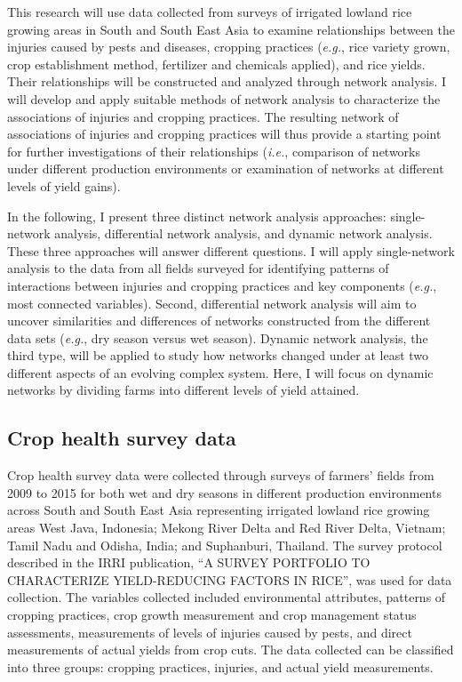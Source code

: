 
This research will use data collected from surveys of irrigated lowland rice growing areas in South and South East Asia to examine relationships between the injuries caused by pests and diseases, cropping practices (\textit{e.g.}, rice variety grown, crop establishment method, fertilizer and chemicals applied), and rice yields. Their relationships will be constructed and analyzed through network analysis. I will develop and apply suitable methods of network analysis to characterize the associations of injuries and cropping practices. The resulting network of associations of injuries and cropping practices will thus provide a starting point for further investigations of their relationships (\textit{i.e.}, comparison of networks under different production environments or examination of networks at different levels of yield gains). 

In the following, I present three distinct network analysis approaches: single-network analysis, differential network analysis, and dynamic network analysis. These three approaches will answer different questions. I will apply single-network analysis to the data from all fields surveyed for identifying patterns of interactions between injuries and cropping practices and key components (\textit{e.g.}, most connected variables). Second, differential network analysis will aim to uncover similarities and differences of networks constructed from the different data sets (\textit{e.g.}, dry season versus wet season). Dynamic network analysis, the third type, will be applied to study how networks changed under at least two different aspects of an evolving complex system. Here, I will focus on dynamic networks by dividing farms into different levels of yield attained. 

\subsection*{Crop health survey data}

Crop health survey data were collected through surveys of farmers' fields from 2009 to 2015 for both wet and dry seasons in different production environments across South and South East Asia representing irrigated lowland rice growing areas West Java, Indonesia; Mekong River Delta and Red River Delta, Vietnam; Tamil Nadu and Odisha, India; and Suphanburi, Thailand. The survey protocol described in the IRRI publication, ``A SURVEY PORTFOLIO TO CHARACTERIZE YIELD-REDUCING FACTORS IN RICE'',  was used for data collection. The variables collected included environmental attributes, patterns of cropping practices, crop growth measurement and crop management status assessments, measurements of levels of injuries caused by pests, and direct measurements of actual yields from crop cuts. The data collected can be classified into three groups: cropping practices, injuries, and actual yield measurements.

